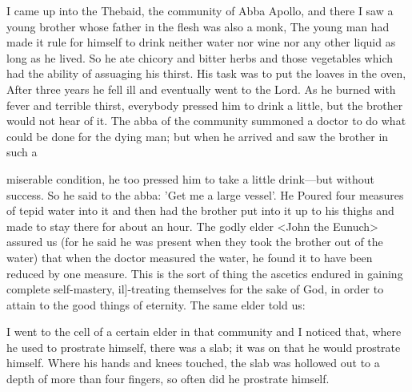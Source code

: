 I came up into the Thebaid, the community of Abba Apollo, and
there I saw a young brother whose father in the flesh was also a
monk, The young man had made it rule for himself to drink neither
water nor wine nor any other liquid as long as he lived. So he ate
chicory and bitter herbs and those vegetables which had the ability
of assuaging his thirst. His task was to put the loaves in the oven,
After three years he fell ill and eventually went to the Lord. As he
burned with fever and terrible thirst, everybody pressed him to drink
a little, but the brother would not hear of it. The abba of the
community summoned a doctor to do what could be done for the
dying man; but when he arrived and saw the brother in such a

miserable condition, he too pressed him to take a little drink—but
without success. So he said to the abba: 'Get me a large vessel'. He
Poured four measures of tepid water into it and then had the
brother put into it up to his thighs and made to stay there for about
an hour. The godly elder <John the Eunuch> assured us (for he
said he was present when they took the brother out of the water)
that when the doctor measured the water, he found it to have been
reduced by one measure. This is the sort of thing the ascetics
endured in gaining complete self-mastery, il]-treating themselves for
the sake of God, in order to attain to the good things of eternity.
The same elder told us:

I went to the cell of a certain elder in that community and I noticed
that, where he used to prostrate himself, there was a slab; it was on
that he would prostrate himself. Where his hands and knees
touched, the slab was hollowed out to a depth of more than four
fingers, so often did he prostrate himself.

